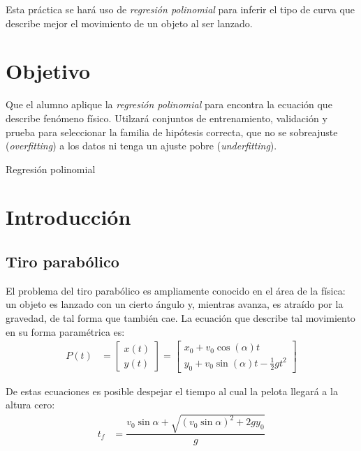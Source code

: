 
Esta práctica se hará uso de \emph{regresión polinomial} para inferir el tipo de curva que describe mejor el movimiento de un objeto al ser lanzado.


\section{Objetivo}

Que el alumno aplique la \textit{regresión polinomial} para encontra la ecuación que describe fenómeno físico.  Utilzará conjuntos de entrenamiento, validación y prueba para seleccionar la familia de hipótesis correcta, que no se sobreajuste (\textit{overfitting}) a los datos ni tenga un ajuste pobre (\textit{underfitting}).

\begin{auxcode}
 \caption{Regresión polinomial}
 \centering
\end{auxcode}



\section{Introducción}

\subsection{Tiro parabólico}

\noindent El problema del tiro parabólico es ampliamente conocido en el área de la física: un objeto es lanzado con un cierto ángulo y, mientras avanza, es atraído por la gravedad, de tal forma que también cae.  La ecuación que describe tal movimiento en su forma paramétrica es:
\begin{align*}
 P(t) &=
 \begin{bmatrix}
  x(t) \\
  y(t)
 \end{bmatrix}
 =
 \begin{bmatrix}
  x_0 + v_{0}\cos(\alpha) t \\
  y_0 + v_{0}\sin(\alpha) t - \frac{1}{2}gt^2
 \end{bmatrix}
\end{align*}

De estas ecuaciones es posible despejar el tiempo al cual la pelota llegará a la altura cero:
\begin{align*}
  t_f &= \dfrac{v_{0}\sin\alpha + \sqrt{(v_{0}\sin\alpha)^2 + 2g y_0}}{g}
\end{align*}

